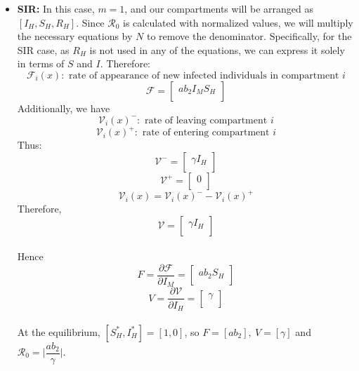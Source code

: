 \begin{itemize}
\item \textbf{SIR:}
In this case, $m=1$, and our compartments will be arranged as $[I_H, S_H, R_H]$. Since $\mathcal{R}_0$ is calculated with normalized values, we will multiply the necessary equations by $N$ to remove the denominator. Specifically, for the SIR case, as $R_H$ is not used in any of the equations, we can express it solely in terms of $S$ and $I$. Therefore:
$$ {\mathcal F}_i(x): \text{ rate of appearance of new infected individuals in compartment } i $$
$$ {\mathcal F} =\begin{bmatrix}
a  b_2  I_M  S_H \\
\end{bmatrix} $$
Additionally, we have
$$ {\mathcal V}_i(x)^-: \text{ rate of leaving compartment } i $$
$$ {\mathcal V}_i(x)^+: \text{ rate of entering compartment } i $$
Thus:
$$
{\mathcal V^-} = \begin{bmatrix}
\gamma I_H\\
\end{bmatrix}
$$
$$
{\mathcal V^+} = \begin{bmatrix}
0\\
\end{bmatrix}
$$
$${\mathcal V}_i (x) = {\mathcal V}_i(x)^{-} - {\mathcal V}_i(x)^+$$
Therefore,
$$
{\mathcal V} =
\begin{bmatrix}
\gamma I_H\\
\end{bmatrix}
$$
\\
Hence
$$ F = \dfrac{\partial{\mathcal F}}{\partial I_M} =\begin{bmatrix}
a  b_2  S_H \\
\end{bmatrix} $$
$$ V = \dfrac{\partial{\mathcal V}}{\partial I_H} =\begin{bmatrix}
\gamma \\
\end{bmatrix} $$
\\At the equilibrium, $[S_H^*, I_H^*] = [1,0]$, so $F=[a  b_2], \ V = [\gamma]$ and $\mathcal{R}_0 = \Big | \dfrac{ab_2}{\gamma}\Big | $.


\end{itemize}
